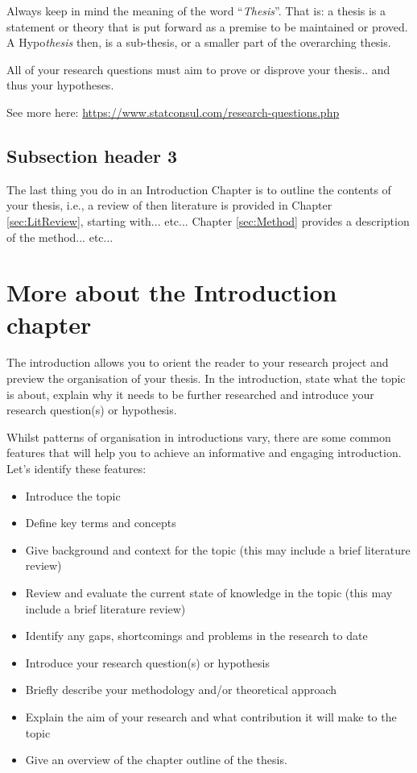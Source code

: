 Always keep in mind the meaning of the word ``\textit{Thesis}''. That is: a
thesis is a statement or theory that is put forward as a premise to be
maintained or proved. A Hypo\textit{thesis} then, is a sub-thesis, or a smaller
part of the overarching thesis.

All of your research questions must aim to prove or disprove your thesis.. and
thus your hypotheses.

See more here: \url{https://www.statconsul.com/research-questions.php}
\subsection{Subsection header 3}
The last thing you do in an Introduction Chapter is to outline the contents of
your thesis, i.e., a review of then literature is provided in Chapter
\ref{sec:LitReview}, starting with... etc... Chapter \ref{sec:Method} provides
a description of the method... etc...

\section{More about the Introduction chapter}
The introduction allows you to orient the reader to your research project and
preview the organisation of your thesis. In the introduction, state what the
topic is about, explain why it needs to be further researched and introduce
your research question(s) or hypothesis.

Whilst patterns of organisation in introductions vary, there are some common
features that will help you to achieve an informative and engaging
introduction. Let’s identify these features:

\begin{itemize}
	\item Introduce the topic
	\item Define key terms and concepts
	\item Give background and context for the topic (this may include a brief literature
	      review)
	\item Review and evaluate the current state of knowledge in the topic (this may
	      include a brief literature review)
	\item Identify any gaps, shortcomings and problems in the research to date
	\item Introduce your research question(s) or hypothesis
	\item Briefly describe your methodology and/or theoretical approach
	\item Explain the aim of your research and what contribution it will make to the
	      topic
	\item Give an overview of the chapter outline of the thesis.
\end{itemize}

